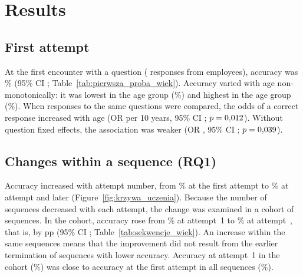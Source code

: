 \section{Results}

\subsection{First attempt}
At the first encounter with a question (\FirstN{} responses from \NEmployees{} employees), accuracy
was \FirstAcc\% (95\% CI \FirstAccCI; Table~\ref{tab:pierwsza_proba_wiek}). Accuracy varied with age
non-monotonically: it was lowest in the \FirstAccMinGroup{} age group (\FirstAccMin\%) and highest in
the \FirstAccMaxGroup{} age group (\FirstAccMax\%). When responses to the same questions were
compared, the odds of a correct response increased with age (OR \FirstAgeOR{} per 10 years, 95\% CI
\FirstAgeORCI; $p = 0{,}012$). Without question fixed effects, the association was weaker
(OR \FirstAgeRawOR, 95\% CI \FirstAgeRawORCI; $p = 0{,}039$).

\begin{table}[H]
\centering
\caption{Accuracy at the first attempt, overall and by employee age group.}
\label{tab:pierwsza_proba_wiek}
\footnotesize
\setlength{\tabcolsep}{4pt}
%
\end{table}

\subsection{Changes within a sequence (RQ1)}
Accuracy increased with attempt number, from \AccAttOne\% \AccAttOneCI{} at the first attempt to
\AccAttMax\% \AccAttMaxCI{} at attempt \AttMax{} and later (Figure~\ref{fig:krzywa_uczenia}). Because
the number of sequences decreased with each attempt, the change was examined in a cohort of
\CohortN{} sequences. In the cohort, accuracy rose from \CohortAccOne\% \CohortAccOneCI{} at
attempt~1 to \CohortAccK\% \CohortAccKCI{} at attempt~\CohortK{}, that is, by \SeqChange{} pp
(95\% CI \SeqChangeCI; Table~\ref{tab:sekwencje_wiek}). An increase within the same sequences means
that the improvement did not result from the earlier termination of sequences with lower accuracy.
Accuracy at attempt~1 in the cohort (\CohortAccOne\%) was close to accuracy at the first attempt in
all sequences (\FirstAcc\%).

